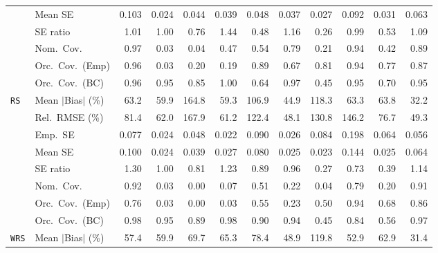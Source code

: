 \begin{landscape}
\begin{longtable}{llrrrrrrrrrr}
 & Mean SE & 0.103 & 0.024 & 0.044 & 0.039 & 0.048 & 0.037 & 0.027 & 0.092 & 0.031 & 0.063 \\
 & SE ratio & \cellcolor{ranktwo}1.01 & \cellcolor{rankone}1.00 & 0.76 & 1.44 & 0.48 & 1.16 & 0.26 & \cellcolor{ranktwo}0.99 & 0.53 & \cellcolor{rankthree}1.09 \\
 & Nom.\ Cov. & \cellcolor{ranktwo}0.97 & 0.03 & 0.04 & 0.47 & 0.54 & 0.79 & 0.21 & \cellcolor{rankone}0.94 & 0.42 & \cellcolor{rankthree}0.89 \\
 & Orc.\ Cov.\ (Emp) & \cellcolor{rankone}0.96 & 0.03 & 0.20 & 0.19 & \cellcolor{ranktwo}0.89 & 0.67 & 0.81 & \cellcolor{rankone}0.94 & 0.77 & \cellcolor{rankthree}0.87 \\
 & Orc.\ Cov.\ (BC) & \cellcolor{ranktwo}0.96 & \cellcolor{rankone}0.95 & 0.85 & 1.00 & 0.64 & \cellcolor{rankthree}0.97 & 0.45 & \cellcolor{rankone}0.95 & 0.70 & \cellcolor{rankone}0.95 \\
\addlinespace[2pt]
\quad \texttt{RS} & Mean $|$Bias$|$ (\%) & 63.2 & 59.9 & 164.8 & \cellcolor{rankthree}59.3 & 106.9 & \cellcolor{ranktwo}44.9 & 118.3 & 63.3 & 63.8 & \cellcolor{rankone}32.2 \\
 & Rel.\ RMSE (\%) & 81.4 & 62.0 & 167.9 & \cellcolor{rankthree}61.2 & 122.4 & \cellcolor{rankone}48.1 & 130.8 & 146.2 & 76.7 & \cellcolor{ranktwo}49.3 \\
 & Emp.\ SE & 0.077 & 0.024 & 0.048 & 0.022 & 0.090 & 0.026 & 0.084 & 0.198 & 0.064 & 0.056 \\
 & Mean SE & 0.100 & 0.024 & 0.039 & 0.027 & 0.080 & 0.025 & 0.023 & 0.144 & 0.025 & 0.064 \\
 & SE ratio & 1.30 & \cellcolor{rankone}1.00 & 0.81 & 1.23 & \cellcolor{rankthree}0.89 & \cellcolor{ranktwo}0.96 & 0.27 & 0.73 & 0.39 & 1.14 \\
 & Nom.\ Cov. & \cellcolor{rankone}0.92 & 0.03 & 0.00 & 0.07 & 0.51 & 0.22 & 0.04 & \cellcolor{rankthree}0.79 & 0.20 & \cellcolor{ranktwo}0.91 \\
 & Orc.\ Cov.\ (Emp) & \cellcolor{rankthree}0.76 & 0.03 & 0.00 & 0.03 & 0.55 & 0.23 & 0.50 & \cellcolor{rankone}0.94 & 0.68 & \cellcolor{ranktwo}0.86 \\
 & Orc.\ Cov.\ (BC) & 0.98 & \cellcolor{rankone}0.95 & 0.89 & 0.98 & 0.90 & \cellcolor{ranktwo}0.94 & 0.45 & 0.84 & 0.56 & \cellcolor{rankthree}0.97 \\
\addlinespace[2pt]
\quad \texttt{WRS} & Mean $|$Bias$|$ (\%) & 57.4 & 59.9 & 69.7 & 65.3 & 78.4 & \cellcolor{ranktwo}48.9 & 119.8 & \cellcolor{rankthree}52.9 & 62.9 & \cellcolor{rankone}31.4 \\

\end{longtable}
\end{landscape}
